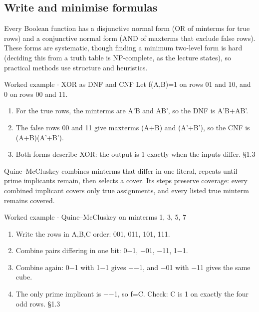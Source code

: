 \documentclass[11pt]{article}
\begin{document}
\begin{keepsection}
\begin{keepsection}
\subsection{Write and minimise formulas}

Every Boolean function has a disjunctive normal form (OR of minterms for true rows) and a conjunctive normal form (AND of maxterms that exclude false rows). These forms are systematic, though finding a minimum two-level form is hard (deciding this from a truth table is NP-complete, as the lecture states), so practical methods use structure and heuristics.

\begin{workedbox}{Worked example \ensuremath{\cdot} XOR as DNF and CNF}
Let f(A,B)=1 on rows 01 and 10, and 0 on rows 00 and 11.

\begin{enumerate}
\item For the true rows, the minterms are A'B and AB', so the DNF is A'B+AB'.
\item The false rows 00 and 11 give maxterms (A+B) and (A'+B'), so the CNF is (A+B)(A'+B').
\item Both forms describe XOR: the output is 1 exactly when the inputs differ. \hfill{\small\color{FAUblue}§1.3}
\end{enumerate}
\end{workedbox}

Quine–McCluskey combines minterms that differ in one literal, repeats until prime implicants remain, then selects a cover. Its steps preserve coverage: every combined implicant covers only true assignments, and every listed true minterm remains covered.

\begin{workedbox}{Worked example \ensuremath{\cdot} Quine–McCluskey on minterms 1, 3, 5, 7}
\begin{enumerate}
\item Write the rows in A,B,C order: 001, 011, 101, 111.
\item Combine pairs differing in one bit: 0\ensuremath{-}1, \ensuremath{-}01, \ensuremath{-}11, 1\ensuremath{-}1.
\item Combine again: 0\ensuremath{-}1 with 1\ensuremath{-}1 gives \ensuremath{-}\ensuremath{-}1, and \ensuremath{-}01 with \ensuremath{-}11 gives the same cube.
\item The only prime implicant is \ensuremath{-}\ensuremath{-}1, so f=C. Check: C is 1 on exactly the four odd rows. \hfill{\small\color{FAUblue}§1.3}
\end{enumerate}
\end{workedbox}


\end{keepsection}
\end{keepsection}
\end{document}
